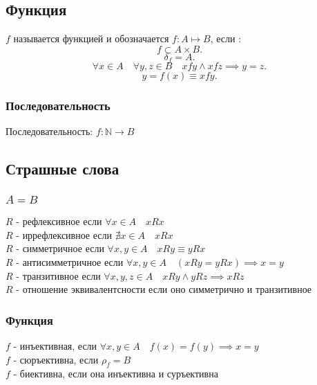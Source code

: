 \documentclass[11pt, oneside]{article}   	%
\begin{document}
    \subsection{Функция}
        $f$ называется функцией и обозначается  $f: A \mapsto B$, если :
        \[ f \subset A \times B .\] 
        \[ \delta_f = A .\]
        \[ \forall{x \in A}\quad\forall{y, z \in B}\quad xfy\land xfz \implies y=z .\]
        \[ y=f(x) \equiv xfy .\]
        \subsubsection{Последовательность}
            Последовательность: $f : \mathbb{N} \to B$ 

    \subsection{Страшные слова}
        \subsubsection{$A = B$}
            $R$ - рефлексивное если  $\forall{x \in A}\quad xRx$\\ 
            $R$ -  иррефлексивное если $\nexists{x \in A}\quad xRx$\\
            $R$ - симметричное если  $\forall{x, y \in A}\quad xRy \equiv yRx$\\
            $R$ - антисимметричное если  $\forall{x, y \in A}\quad \left(xRy = yRx\right) \implies x=y$ \\
            $R$ - транзитивное если $\forall{x, y, z \in A}\quad xRy\land yRz \implies xRz$\\
            $R$ - отношение эквивалентсности если оно симметрично и транзитивное\\
        \subsubsection{Функция}
            $f$ - инъективная, если  $\forall{x, y \in A}\quad f(x) = f(y) \implies x = y$\\ 
            $f$ - сюръективна, если  $\rho_f = B$\\
            $f$ - биективна, если она инъективна и суръективна
\end{document}
